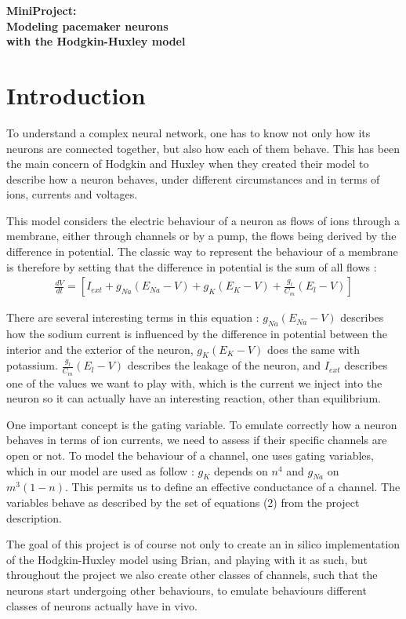 \documentclass[a4paper,11pt]{article} %
\begin{document}
\begin{center}
    \bfseries\Large
    MiniProject:\\
    Modeling pacemaker neurons\\
    with the Hodgkin-Huxley model

\end{center}
\section{Introduction}
To understand a complex neural network, one has to know not only how its
neurons are connected together, but also how each of them behave.
This has been the main concern of Hodgkin and Huxley when they created
their model to describe how a neuron behaves, under different circumstances
and in terms of ions, currents and voltages.

This model considers the electric behaviour of a neuron as flows of ions
through a membrane, either through channels or by a pump, the flows being
derived by the difference in potential. The classic way to represent the
behaviour of a membrane is therefore by setting that the difference in
potential is the sum of all flows :
\begin{align*}\frac{dV}{dt} = [I_{ext}+g_{Na}(E_{Na}-V)+g_K(E_K-V)+\frac{g_l}{C_m}(E_l-V)]\end{align*}

There are several interesting terms in this equation : $g_{Na}(E_{Na}-V)$
describes how the sodium current is influenced by the difference in
potential between the interior and the exterior of the neuron, $g_K(E_K-V)$
does the same with potassium. $\frac{g_l}{C_m}(E_l-V)$ describes the
leakage of the neuron, and $I_{ext}$ describes one of the values we want
to play with, which is the current we inject into the neuron so it can
actually have an interesting reaction, other than equilibrium.

One important concept is the gating variable. To emulate correctly how
a neuron behaves in terms of ion currents, we need to assess if their
specific channels are open or not. To model the behaviour of a channel,
one uses gating variables, which in our model are used as follow :
$g_K$ depends on $n^4$ and $g_{Na}$ on $m^3(1-n)$. This permits us to
define an effective conductance of a channel. The variables behave as
described by the set of equations (2) from the project description.

The goal of this project is of course not only to create an in silico
implementation of the Hodgkin-Huxley model using Brian, and playing with
it as such, but throughout the project we also create other classes of
channels, such that the neurons start undergoing other behaviours, to
emulate behaviours different classes of neurons actually have in vivo.
\end{document}
